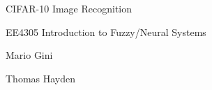 \documentclass[12pt, a4paper]{article}
\numberwithin{equation}{section}
\begin{document}
    \begin{titlepage}

    \begin{center}
    \vspace*{6cm}
    \centering
    \Huge
    { CIFAR-10 Image Recognition }
    \vspace{2cm}

    \Huge
    {EE4305 Introduction to Fuzzy/Neural Systems}
    \vspace{0.5cm}
    
    \Large
    {Mario Gini

    Thomas Hayden}
    \vfill
    \vspace{0.8cm}
    \end{center}
    \end{titlepage}

    \newpage
    \tableofcontents










\end{document}
